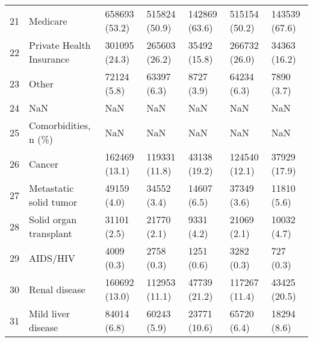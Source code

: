 \begin{tabular}{lllllll}
21 &                                           Medicare &      658693 (53.2) &                 515824 (50.9) &             142869 (63.6) &                  515154 (50.2) &             143539 (67.6) \\
22 &                           Private Health Insurance &      301095 (24.3) &                 265603 (26.2) &              35492 (15.8) &                  266732 (26.0) &              34363 (16.2) \\
23 &                                              Other &        72124 (5.8) &                   63397 (6.3) &                8727 (3.9) &                    64234 (6.3) &                7890 (3.7) \\
24 &                                                NaN &                NaN &                           NaN &                       NaN &                            NaN &                       NaN \\
25 &                               Comorbidities, n (\%) &                NaN &                           NaN &                       NaN &                            NaN &                       NaN \\
26 &                                             Cancer &      162469 (13.1) &                 119331 (11.8) &              43138 (19.2) &                  124540 (12.1) &              37929 (17.9) \\
27 &                             Metastatic solid tumor &        49159 (4.0) &                   34552 (3.4) &               14607 (6.5) &                    37349 (3.6) &               11810 (5.6) \\
28 &                             Solid organ transplant &        31101 (2.5) &                   21770 (2.1) &                9331 (4.2) &                    21069 (2.1) &               10032 (4.7) \\
29 &                                           AIDS/HIV &         4009 (0.3) &                    2758 (0.3) &                1251 (0.6) &                     3282 (0.3) &                 727 (0.3) \\
30 &                                      Renal disease &      160692 (13.0) &                 112953 (11.1) &              47739 (21.2) &                  117267 (11.4) &              43425 (20.5) \\
31 &                                 Mild liver disease &        84014 (6.8) &                   60243 (5.9) &              23771 (10.6) &                    65720 (6.4) &               18294 (8.6) \\

\end{tabular}
